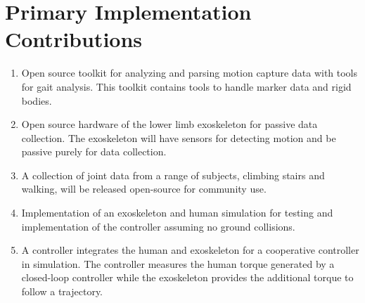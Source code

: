 \section{Primary Implementation Contributions}
\begin{enumerate}[wide, nosep, labelindent = 0pt, topsep = 1ex]
    \item Open source toolkit for analyzing and parsing motion capture data with tools for gait analysis. This toolkit contains tools to handle marker data and rigid bodies.  
    \item Open source hardware of the lower limb exoskeleton for passive data collection. The exoskeleton will have sensors for detecting motion and be passive purely for data collection.
    \item A collection of joint data from a range of subjects, climbing stairs and walking, will be released open-source for community use.  
    \item  Implementation of an exoskeleton and human simulation for testing and implementation of the controller assuming no ground collisions.
    \item A controller integrates the human and exoskeleton for a cooperative controller in simulation. The controller measures the human torque generated by a closed-loop controller while the exoskeleton provides the additional torque to follow a trajectory.  

\end{enumerate}